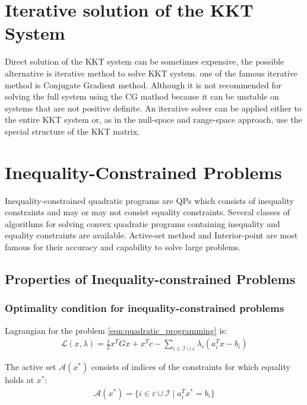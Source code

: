 \section{Iterative solution of the KKT System}
Direct solution of the KKT system can be sometimes expensive, the possible alternative is iterative method to solve KKT system. one of the famous iterative method is Conjugate Gradient method. Although it is not recommended for solving the full system using the CG mathod because it can be unstable on systems that are not positive definite. An iterative solver can be applied either to the entire KKT system or, as in the null-space and range-space approach, use the special structure of the KKT matrix.

\section{Inequality-Constrained Problems}
Inequality-constrained quadratic programs are QPs which consists of inequality constraints and may or may not consist equality constraints. Several classes of algorithms for solving convex quadratic programs containing inequality and equality constraints are available. Active-set method and Interior-point are most famous for their accuracy and capability to solve large problems.

\subsection{Properties of Inequality-constrained Problems}
\subsubsection*{Optimality condition for inequality-constrained problems}
Lagrangian for the problem \ref{eqn:quadratic_programming} is:
\begin{equation}
	\begin{aligned}
		\mathcal{L}(x,\lambda ) = \frac{1}{2}x^TGx + x^Tc-\sum_{i\in \mathcal{I}\cup \varepsilon} \lambda_i(a_i^Tx-b_i)
	\end{aligned}
	\label{eqn:Lagrangian_for_QP_1}
\end{equation}

The active set $\mathcal{A}(x^*)$ consists of indices of the constraints for which equality holds at $x^*$:
\begin{equation}
	\begin{aligned}
		\mathcal{A}(x^*) = \lbrace i\in \varepsilon \cup \mathcal{I}\mid a_i^Tx^* = b_i \rbrace
	\end{aligned}
\end{equation}

